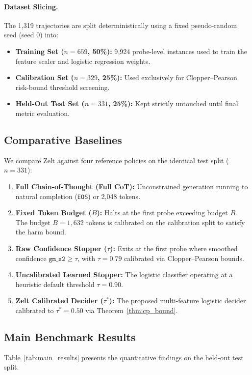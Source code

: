 \documentclass[11pt]{article}
\begin{document}
\paragraph{Dataset Slicing.}
The 1{,}319 trajectories are split deterministically using a fixed pseudo-random seed (seed 0) into:
\begin{itemize}
  \item \textbf{Training Set ($n=659$, 50\%):} 9{,}924 probe-level instances used to train the feature scaler and logistic regression weights.
  \item \textbf{Calibration Set ($n=329$, 25\%):} Used exclusively for Clopper--Pearson risk-bound threshold screening.
  \item \textbf{Held-Out Test Set ($n=331$, 25\%):} Kept strictly untouched until final metric evaluation.
\end{itemize}

\subsection{Comparative Baselines}
We compare Zelt against four reference policies on the identical test split ($n=331$):
\begin{enumerate}
  \item \textbf{Full Chain-of-Thought (Full CoT):} Unconstrained generation running to natural completion (\texttt{EOS}) or 2{,}048 tokens.
  \item \textbf{Fixed Token Budget ($B$):} Halts at the first probe exceeding budget $B$. The budget $B=1{,}632$ tokens is calibrated on the calibration split to satisfy the harm bound.
  \item \textbf{Raw Confidence Stopper ($\tau$):} Exits at the first probe where smoothed confidence $\texttt{gm\_s2} \ge \tau$, with $\tau=0.79$ calibrated via Clopper--Pearson bounds.
  \item \textbf{Uncalibrated Learned Stopper:} The logistic classifier operating at a heuristic default threshold $\tau=0.90$.
  \item \textbf{Zelt Calibrated Decider ($\tau^*$):} The proposed multi-feature logistic decider calibrated to $\tau^*=0.50$ via Theorem~\ref{thm:cp_bound}.
\end{enumerate}

\subsection{Main Benchmark Results}
Table~\ref{tab:main_results} presents the quantitative findings on the held-out test split.
\end{document}
